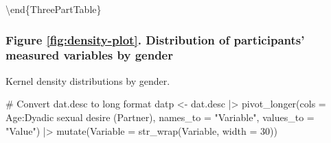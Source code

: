 \documentclass[
  bookmarksnumbered]{article}
\newenvironment{Shaded}{\begin{snugshade}}{\end{snugshade}}
\newcommand{\AttributeTok}[1]{\textcolor[rgb]{0.80,0.80,0.80}{#1}}
\newcommand{\CommentTok}[1]{\textcolor[rgb]{0.50,0.62,0.50}{#1}}
\newcommand{\DecValTok}[1]{\textcolor[rgb]{0.86,0.86,0.80}{#1}}
\newcommand{\FunctionTok}[1]{\textcolor[rgb]{0.94,0.94,0.56}{#1}}
\newcommand{\NormalTok}[1]{\textcolor[rgb]{0.80,0.80,0.80}{#1}}
\newcommand{\OtherTok}[1]{\textcolor[rgb]{0.94,0.94,0.56}{#1}}
\newcommand{\SpecialCharTok}[1]{\textcolor[rgb]{0.86,0.64,0.64}{#1}}
\newcommand{\StringTok}[1]{\textcolor[rgb]{0.80,0.58,0.58}{#1}}
\begin{document}
\textbackslash end\{ThreePartTable\}
\endgroup{}

\hypertarget{figure-reffigdensity-plot.-distribution-of-participants-measured-variables-by-gender}{%
\subsubsection{Figure \ref{fig:density-plot}. Distribution of participants' measured variables by gender}\label{figure-reffigdensity-plot.-distribution-of-participants-measured-variables-by-gender}}

Kernel density distributions by gender.

\begin{Shaded}
\begin{Highlighting}[]
\CommentTok{\# Convert dat.desc to long format}
\NormalTok{datp }\OtherTok{\textless{}{-}}\NormalTok{ dat.desc }\SpecialCharTok{|\textgreater{}} 
  \FunctionTok{pivot\_longer}\NormalTok{(}\AttributeTok{cols =}\NormalTok{ Age}\SpecialCharTok{:}\StringTok{\textasciigrave{}}\AttributeTok{Dyadic sexual desire (Partner)}\StringTok{\textasciigrave{}}\NormalTok{,}
               \AttributeTok{names\_to =} \StringTok{"Variable"}\NormalTok{, }
               \AttributeTok{values\_to =} \StringTok{"Value"}\NormalTok{) }\SpecialCharTok{|\textgreater{}}
  \FunctionTok{mutate}\NormalTok{(}\AttributeTok{Variable =} \FunctionTok{str\_wrap}\NormalTok{(Variable, }\AttributeTok{width =} \DecValTok{30}\NormalTok{))}


\end{Highlighting}
\end{Shaded}
\end{document}
